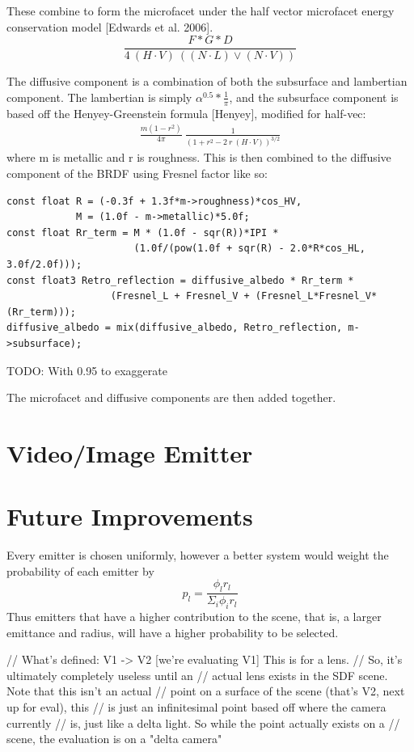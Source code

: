\documentclass{article}
\begin{document}
  These combine to form the microfacet under the half vector microfacet energy conservation model [Edwards et al. 2006].
  \[
  	\frac{F*G*D}{4 \: (H \cdot V) \: ( (N \cdot L) \vee (N \cdot V) )}
  \]
  
  The diffusive component is a combination of both the subsurface and lambertian component. The lambertian is simply $\alpha^{0.5} * \frac{1}{\pi}$, and the subsurface component is based off the Henyey-Greenstein formula [Henyey], modified for half-vec:
  \begin{align}
  	\frac{m(1 - r^2)}{4\pi}\:\frac{1}{(1 + r^2 - 2\:r\:
  		(H \cdot V))^{3/2}}
  \end{align}
  where m is metallic and r is roughness. This is then combined to the diffusive component of the BRDF using Fresnel factor like so:
  \begin{lstlisting}
const float R = (-0.3f + 1.3f*m->roughness)*cos_HV,
            M = (1.0f - m->metallic)*5.0f;
const float Rr_term = M * (1.0f - sqr(R))*IPI *
                      (1.0f/(pow(1.0f + sqr(R) - 2.0*R*cos_HL, 3.0f/2.0f)));
const float3 Retro_reflection = diffusive_albedo * Rr_term *
                  (Fresnel_L + Fresnel_V + (Fresnel_L*Fresnel_V*(Rr_term)));
diffusive_albedo = mix(diffusive_albedo, Retro_reflection, m->subsurface);

  \end{lstlisting}
  TODO: With 0.95 to exaggerate
  
  The microfacet and diffusive components are then added together.

  \section{Video/Image Emitter}

  \section{Future Improvements}

  Every emitter is chosen uniformly, however a better system would weight the
  probability of each emitter by
  \[
    p_l = \frac{\phi_lr_l}{\Sigma_i\phi_ir_l}
  \]
  Thus emitters that have a higher contribution to the scene, that is, a larger
  emittance and radius, will have a higher probability to be selected.

 
        // What's defined: V1 -> V2 [we're evaluating V1] This is for a lens.
        // So, it's ultimately completely useless until an
        // actual lens exists in the SDF scene. Note that this isn't an actual
        // point on a surface of the scene (that's V2, next up for eval), this
        // is just an infinitesimal point based off where the camera currently
        // is, just like a delta light. So while the point actually exists on a
        // scene, the evaluation is on a "delta camera"
  
\end{document}
